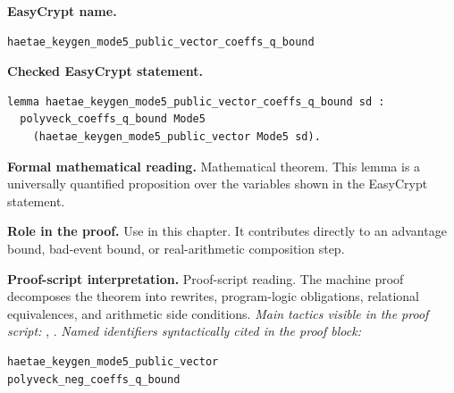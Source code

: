 \begin{formaltheorem}
\noindent\textbf{EasyCrypt name.}
\begin{lstlisting}[language=EasyCrypt,basicstyle=\ttfamily\scriptsize]
haetae_keygen_mode5_public_vector_coeffs_q_bound
\end{lstlisting}
\noindent\textbf{Checked EasyCrypt statement.}
\begin{lstlisting}[language=EasyCrypt,basicstyle=\ttfamily\scriptsize]
lemma haetae_keygen_mode5_public_vector_coeffs_q_bound sd :
  polyveck_coeffs_q_bound Mode5
    (haetae_keygen_mode5_public_vector Mode5 sd).
\end{lstlisting}
\noindent\textbf{Formal mathematical reading.}
Mathematical theorem. This lemma is a universally quantified proposition over the variables shown in the EasyCrypt statement.

\noindent\textbf{Role in the proof.}
Use in this chapter. It contributes directly to an advantage bound, bad-event bound, or real-arithmetic composition step.

\noindent\textbf{Proof-script interpretation.}
Proof-script reading. The machine proof decomposes the theorem into rewrites, program-logic obligations, relational equivalences, and arithmetic side conditions.
\emph{Main tactics visible in the proof script:} , .
\emph{Named identifiers syntactically cited in the proof block:}
\begin{lstlisting}[language=EasyCrypt,basicstyle=\ttfamily\scriptsize]
haetae_keygen_mode5_public_vector
polyveck_neg_coeffs_q_bound
\end{lstlisting}

\end{formaltheorem}

